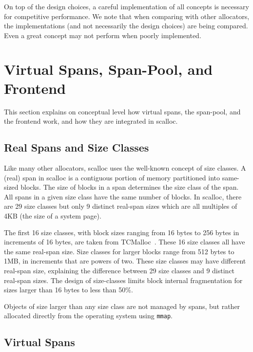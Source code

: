 \documentclass[10pt]{sigplanconf}
\begin{document}
On top of the design choices, a careful implementation of all concepts is necessary for competitive performance. We note that when comparing with other allocators, the implementations (and not necessarily the design choices) are being compared. Even a great concept may not perform when poorly implemented.   

\section{Virtual Spans, Span-Pool, and Frontend}\label{sec:scalloc}

This section explains on conceptual level how virtual spans, the span-pool, and the frontend work, and how they are integrated in scalloc.

\subsection{Real Spans and Size Classes}

Like many other allocators, scalloc uses the well-known concept of size classes.
A (real) span in scalloc is a contiguous portion of memory partitioned into same-sized
blocks. The size of blocks in a span determines the size class of the span. All spans in a given size class have the same number of blocks. In scalloc, there are 29 size classes but only 9 distinct real-span
sizes which are all multiples of 4KB (the size of a system page).

The first 16 size classes, with block sizes ranging from 16 bytes to 256 bytes
in increments of 16 bytes, are taken from TCMalloc~\cite{tcmalloc}.  These 16 size classes all have the same real-span
size. Size classes for larger blocks range from 512 bytes to 1MB, in increments
that are powers of two. These
size classes may have different real-span size, explaining the difference
between 29 size classes and 9 distinct real-span sizes. The design
of size-classes limits block internal fragmentation for sizes larger than
16 bytes to less than 50\%. 
  
Objects of size larger than any size class are not managed by spans, but rather
allocated directly from the operating system using {\tt mmap}.

\subsection{Virtual Spans}
\end{document}
